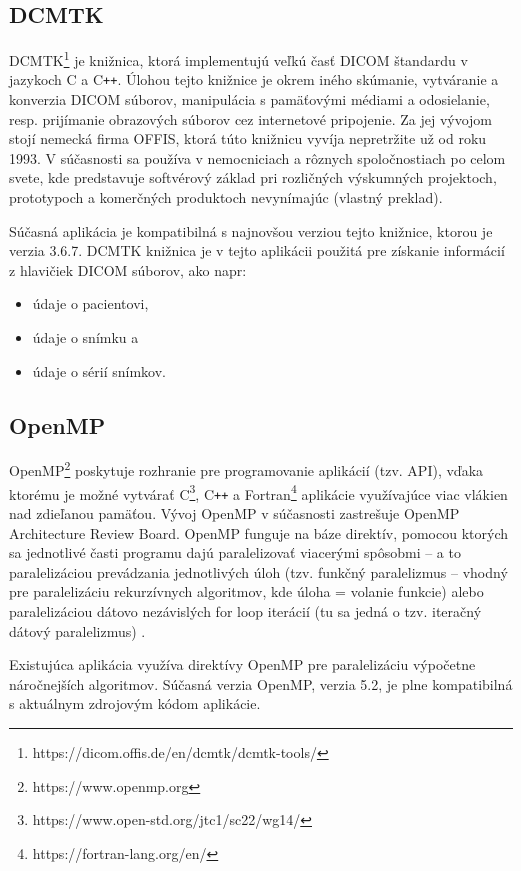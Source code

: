 \subsection {DCMTK}\label{dcmtk}
DCMTK\footnote{https://dicom.offis.de/en/dcmtk/dcmtk-tools/} je knižnica, ktorá implementujú veľkú časť DICOM štandardu v jazykoch C a C\texttt{++}. Úlohou tejto knižnice je okrem iného skúmanie, vytváranie a konverzia DICOM súborov, manipulácia s pamäťovými médiami a odosielanie, resp. prijímanie obrazových súborov cez internetové pripojenie. Za jej vývojom stojí nemecká firma OFFIS, ktorá túto knižnicu vyvíja nepretržite už od roku 1993. V súčasnosti sa používa v nemocniciach a rôznych spoločnostiach po celom svete, kde predstavuje softvérový základ pri rozličných výskumných projektoch, prototypoch a komerčných produktoch nevynímajúc \cite{dcmtk_description} (vlastný preklad). \newline

Súčasná aplikácia je kompatibilná s najnovšou verziou tejto knižnice, ktorou je verzia 3.6.7. DCMTK knižnica je v tejto aplikácii použitá pre získanie informácií z hlavičiek DICOM súborov, ako napr:

\begin{itemize}
\item {údaje o pacientovi,}
\item {údaje o snímku a}
\item {údaje o sérií snímkov.}
\end{itemize}

\subsection {OpenMP}\label{openmp}
OpenMP\footnote{https://www.openmp.org} poskytuje rozhranie pre programovanie aplikácií (tzv. API), vďaka ktorému je možné vytvárať C\footnote{https://www.open-std.org/jtc1/sc22/wg14/}, C\texttt{++} a Fortran\footnote{https://fortran-lang.org/en/} aplikácie využívajúce viac vlákien nad zdieľanou pamäťou. Vývoj OpenMP v súčasnosti zastrešuje OpenMP Architecture Review Board.
OpenMP funguje na báze direktív, pomocou ktorých sa jednotlivé časti programu dajú paralelizovať viacerými spôsobmi -- a to paralelizáciou prevádzania jednotlivých úloh (tzv. funkčný paralelizmus -- vhodný pre paralelizáciu rekurzívnych algoritmov, kde úloha = volanie funkcie) alebo paralelizáciou dátovo nezávislých for loop iterácií (tu sa jedná o tzv. iteračný dátový paralelizmus) \cite{openmp_description}.

Existujúca aplikácia využíva direktívy OpenMP pre paralelizáciu výpočetne náročnejších algoritmov. Súčasná verzia OpenMP, verzia 5.2, je plne kompatibilná s aktuálnym zdrojovým kódom aplikácie.

